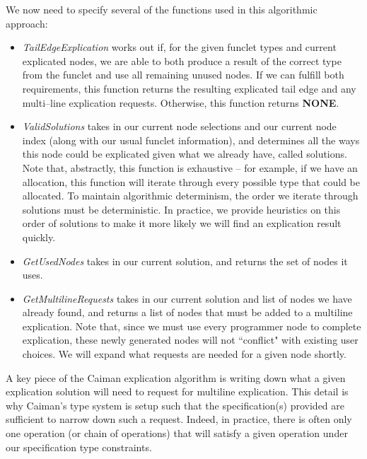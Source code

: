 We now need to specify several of the functions used in this algorithmic approach:
%
\begin{itemize}
\item \textit{TailEdgeExplication} works out if, for the given funclet types and current explicated nodes, we are able to both produce a result of the correct type from the funclet and use all remaining unused nodes.  If we can fulfill both requirements, this function returns the resulting explicated tail edge and any multi--line explication requests.  Otherwise, this function returns \textbf{NONE}.
\item \textit{ValidSolutions} takes in our current node selections and our current node index (along with our usual funclet information), and determines all the ways this node could be explicated given what we already have, called solutions.  Note that, abstractly, this function is exhaustive -- for example, if we have an allocation, this function will iterate through every possible type that could be allocated.  To maintain algorithmic determinism, the order we iterate through solutions must be deterministic.  In practice, we provide heuristics on this order of solutions to make it more likely we will find an explication result quickly.
\item \textit{GetUsedNodes} takes in our current solution, and returns the set of nodes it uses.
\item \textit{GetMultilineRequests} takes in our current solution and list of nodes we have already found, and returns a list of nodes that must be added to a multiline explication.  Note that, since we must use every programmer node to complete explication, these newly generated nodes will not ``conflict" with existing user choices.  We will expand what requests are needed for a given node shortly.
\end{itemize}
%
A key piece of the Caiman explication algorithm is writing down what a given explication solution will need to request for multiline explication.  This detail is why Caiman's type system is setup such that the specification(s) provided are sufficient to narrow down such a request.  Indeed, in practice, there is often only one operation (or chain of operations) that will satisfy a given operation under our specification type constraints.

